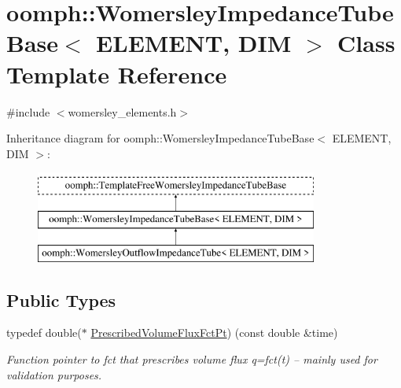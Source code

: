 \hypertarget{classoomph_1_1WomersleyImpedanceTubeBase}{}\section{oomph\+:\+:Womersley\+Impedance\+Tube\+Base$<$ E\+L\+E\+M\+E\+NT, D\+IM $>$ Class Template Reference}
\label{classoomph_1_1WomersleyImpedanceTubeBase}


{\ttfamily \#include $<$womersley\+\_\+elements.\+h$>$}

Inheritance diagram for oomph\+:\+:Womersley\+Impedance\+Tube\+Base$<$ E\+L\+E\+M\+E\+NT, D\+IM $>$\+:\begin{figure}[H]
\begin{center}
\leavevmode
\includegraphics[height=3.000000cm]{classoomph_1_1WomersleyImpedanceTubeBase}
\end{center}
\end{figure}
\subsection*{Public Types}
\begin{DoxyCompactItemize}
\item 
typedef double($\ast$ \hyperlink{classoomph_1_1WomersleyImpedanceTubeBase_a329107c12ef8f97c5afd4e0ae5d67b70}{Prescribed\+Volume\+Flux\+Fct\+Pt}) (const double \&time)
\begin{DoxyCompactList}\small\item\em Function pointer to fct that prescribes volume flux q=fct(t) -- mainly used for validation purposes. \end{DoxyCompactList}\end{DoxyCompactItemize}
